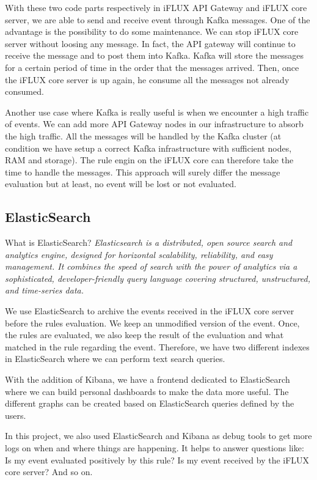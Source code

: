 With these two code parts respectively in iFLUX API Gateway and iFLUX core server, we are able to send and receive event through Kafka messages. One of the advantage is the possibility to do some maintenance. We can stop iFLUX core server without loosing any message. In fact, the API gateway will continue to receive the message and to post them into Kafka. Kafka will store the messages for a certain period of time in the order that the messages arrived. Then, once the iFLUX core server is up again, he consume all the messages not already consumed.

Another use case where Kafka is really useful is when we encounter a high traffic of events. We can add more API Gateway nodes in our infrastructure to absorb the high traffic. All the messages will be handled by the Kafka cluster (at condition we have setup a correct Kafka infrastructure with sufficient nodes, RAM and storage). The rule engin on the iFLUX core can therefore take the time to handle the messages. This approach will surely differ the message evaluation but at least, no event will be lost or not evaluated.

\subsection{ElasticSearch}

What is ElasticSearch? \emph{Elasticsearch is a distributed, open source search and analytics engine, designed for horizontal scalability, reliability, and easy management. It combines the speed of search with the power of analytics via a sophisticated, developer-friendly query language covering structured, unstructured, and time-series data.}

We use ElasticSearch to archive the events received in the iFLUX core server before the rules evaluation. We keep an unmodified version of the event. Once, the rules are evaluated, we also keep the result of the evaluation and what matched in the rule regarding the event. Therefore, we have two different indexes in ElasticSearch where we can perform text search queries.

With the addition of Kibana, we have a frontend dedicated to ElasticSearch where we can build personal dashboards to make the data more useful. The different graphs can be created based on ElasticSearch queries defined by the users.

In this project, we also used ElasticSearch and Kibana as debug tools to get more logs on when and where things are happening. It helps to answer questions like: Is my event evaluated positively by this rule? Is my event received by the iFLUX core server? And so on.

